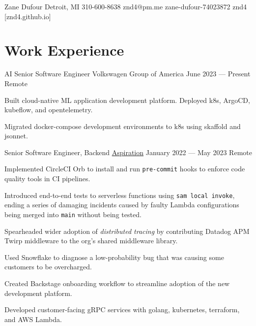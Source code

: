 \documentclass[letterpaper]{resume_config}
\newcommand{\code}[1]{\colorbox{light-gray}{\texttt{#1}}}
\begin{document}
\Header
    {Zane Dufour} %
    {Detroit, MI} %
    {310-600-8638} %
    {znd4@pm.me} %
    {zane-dufour-74023872} %
    {znd4} %
    [znd4.github.io] %


\section{Work Experience}

\WorkExperience
    {AI Senior Software Engineer} %
    {Volkswagen Group of America} %
    {June 2023 --- Present} %
    {Remote} %
    {
        \item Built cloud-native ML application development platform. Deployed k8s, ArgoCD, kubeflow, and opentelemetry.
        \item Migrated docker-compose development environments to k8s using skaffold and jsonnet.
    } 

\WorkExperience
    {Senior Software Engineer, Backend} %
    {\href{https://www.aspiration.com/}{Aspiration}} %
    {January 2022 --- May 2023} %
    {Remote} %
    {
        \item Implemented CircleCI Orb to install and run \code{pre-commit} hooks to enforce code quality tools in CI pipelines.
        \item Introduced end-to-end tests to serverless functions using \code{sam local invoke}, ending a series of damaging incidents caused by faulty Lambda configurations being merged into \code{main} without being tested.
        \item Spearheaded wider adoption of \textit{distributed tracing} by contributing Datadog APM Twirp middleware to the org's shared middleware library.
        \item Used Snowflake to diagnose a low-probability bug that was causing some customers to be overcharged.
        \item Created Backstage onboarding workflow to streamline adoption of the new development platform.
        \item Developed customer-facing gRPC services with golang, kubernetes, terraform, and AWS Lambda.
    }
\end{document}
